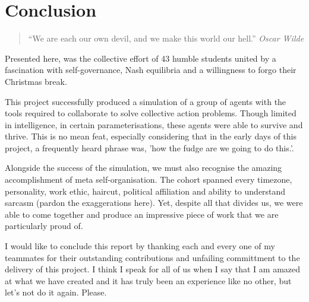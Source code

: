 \chapter{Conclusion}


\begin{flushleft}
    \begin{quote}
        ``We are each our own devil, and we make this world our hell.''
        \linebreak
        \emph{Oscar Wilde}
    \end{quote}
\end{flushleft}

Presented here, was the collective effort of 43 humble students united by a fascination with self-governance, Nash equilibria and a willingness to forgo their Christmas break. 

This project successfully produced a simulation of a group of agents with the tools required to collaborate to solve collective action problems. Though limited in intelligence, in certain parameterisations, these agents were able to survive and thrive. This is no mean feat, especially considering that in the early days of this project, a frequently heard phrase was, 'how the fudge are we going to do this.'.

Alongside the success of the simulation, we must also recognise the amazing accomplishment of meta self-organisation. The cohort spanned every timezone, personality, work ethic, haircut, political affiliation and ability to understand sarcasm (pardon the exaggerations here). Yet, despite all that divides us, we were able to come together and produce an impressive piece of work that we are particularly proud of. 

I would like to conclude this report by thanking each and every one of my teammates for their outstanding contributions and unfailing committment to the delivery of this project. I think I speak for all of us when I say that I am amazed at what we have created and it has truly been an experience like no other, but let's not do it again. Please.
